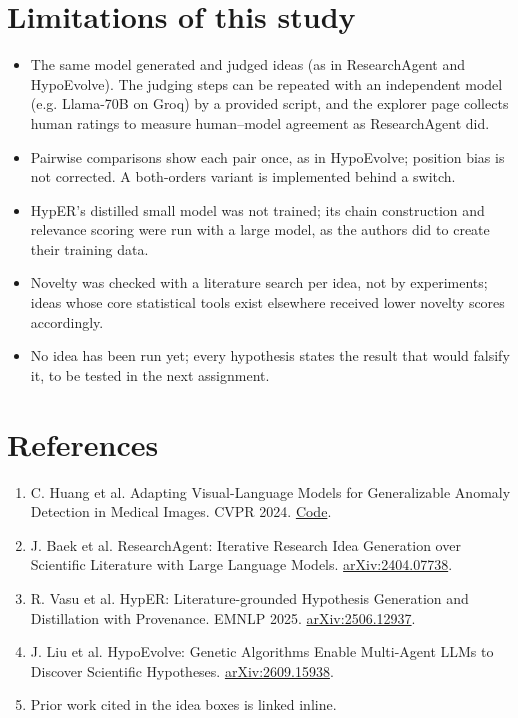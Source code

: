 \documentclass[11pt,a4paper]{article}
\begin{document}
\section{Limitations of this study}
\begin{itemize}[leftmargin=1.2em]
\item The same model generated and judged ideas (as in ResearchAgent and HypoEvolve). The judging steps can be repeated with an independent model (e.g. Llama-70B on Groq) by a provided script, and the explorer page collects human ratings to measure human–model agreement as ResearchAgent did.
\item Pairwise comparisons show each pair once, as in HypoEvolve; position bias is not corrected. A both-orders variant is implemented behind a switch.
\item HypER's distilled small model was not trained; its chain construction and relevance scoring were run with a large model, as the authors did to create their training data.
\item Novelty was checked with a literature search per idea, not by experiments; ideas whose core statistical tools exist elsewhere received lower novelty scores accordingly.
\item No idea has been run yet; every hypothesis states the result that would falsify it, to be tested in the next assignment.
\end{itemize}
\section*{References}
\begin{enumerate}[leftmargin=1.6em,itemsep=1pt]
\item C. Huang et al. Adapting Visual-Language Models for Generalizable Anomaly Detection in Medical Images. CVPR 2024. \href{https://github.com/MediaBrain-SJTU/MVFA-AD}{Code}.
\item J. Baek et al. ResearchAgent: Iterative Research Idea Generation over Scientific Literature with Large Language Models. \href{https://arxiv.org/pdf/2404.07738}{arXiv:2404.07738}.
\item R. Vasu et al. HypER: Literature-grounded Hypothesis Generation and Distillation with Provenance. EMNLP 2025. \href{https://arxiv.org/pdf/2506.12937}{arXiv:2506.12937}.
\item J. Liu et al. HypoEvolve: Genetic Algorithms Enable Multi-Agent LLMs to Discover Scientific Hypotheses. \href{https://arxiv.org/pdf/2609.15938}{arXiv:2609.15938}.
\item Prior work cited in the idea boxes is linked inline.
\end{enumerate}
\end{document}
